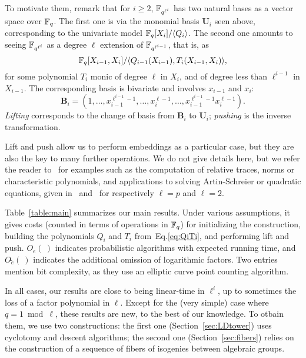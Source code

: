 \documentclass{sig-alternate}
\newcommand{\bb}{\mathbf{B}}
\newcommand{\uu}{\mathbf{U}}  %
\begin{document}
To motivate them, remark that for $i \ge 2$, $\mathbb{F}_{q^{\ell^{i}}}$ has
two natural bases as a vector space over $\mathbb{F}_q$. The first one is via
the monomial basis $\uu_{i}$ seen above, corresponding to the
univariate model $\mathbb{F}_q[X_{i}]/ \langle Q_{i} \rangle$. The second one
amounts to seeing $\mathbb{F}_{q^{\ell^{i}}}$ as a degree $\ell$ extension of
$\mathbb{F}_{q^{\ell^{i-1}}}$, that is, as
\begin{equation}\label{eq:QiTi}
\mathbb{F}_q[X_{i-1},X_i]/\langle Q_{i-1}(X_{i-1}), T_i(X_{i-1},X_i)\rangle,  
\end{equation}
for some polynomial $T_i$ monic of degree $\ell$ in $X_{i}$, and of
degree less than $\ell^{i-1}$ in $X_{i-1}$.  The corresponding basis is
bivariate and involves $x_{i-1}$ and $x_i$:
\begin{equation}
  \label{eq:bi-basis}
  \bb_{i} = (1,\ldots,x_{i-1}^{\ell^{i-1}-1},\ldots,x_i^{\ell-1},\ldots,x_{i-1}^{\ell^{i-1}-1}x_i^{\ell-1}).
\end{equation}
{\em Lifting} corresponds to the change of basis from $\bb_i$ to
$\uu_i$; {\em pushing} is the inverse transformation.

Lift and push allow us to perform embeddings as a particular case, but
they are also the key to many further operations. We do not give
details here, but we refer the reader
to~\cite{df+schost12,DoSc12,LeSc12} for examples such as the
computation of relative traces, norms or characteristic polynomials,
and applications to solving Artin-Schreier or quadratic equations,
given in~\cite{df+schost12} and~\cite{DoSc12} for respectively
$\ell=p$ and $\ell=2$.

Table~\ref{table:main} summarizes our main results.  Under various
assumptions, it gives costs (counted in terms of operations in $\mathbb{F}_q$)
for initializing the construction, building the polynomials $Q_i$ and
$T_i$ from~Eq.\eqref{eq:QiTi}, and performing lift and push. $O_e(\ )$
indicates probabilistic algorithms with expected running time, and
$O\tilde{_e}(\ )$ indicates the additional omission of logarithmic
factors.  Two entries mention bit complexity, as they use an elliptic
curve point counting algorithm.

In all cases, our results are close to being linear-time in $\ell^i$,
up to sometimes the loss of a factor polynomial in $\ell$.  Except for
the (very simple) case where $q=1 \bmod \ell$, these results are new,
to the best of our knowledge. To otbain them, we use two
constructions: the first one (Section~\ref{sec:LDtower}) uses
cyclotomy and descent algorithms; the second one
(Section~\ref{sec:fibers}) relies on the construction of a sequence of
fibers of isogenies between algebraic groups. 
\end{document}

